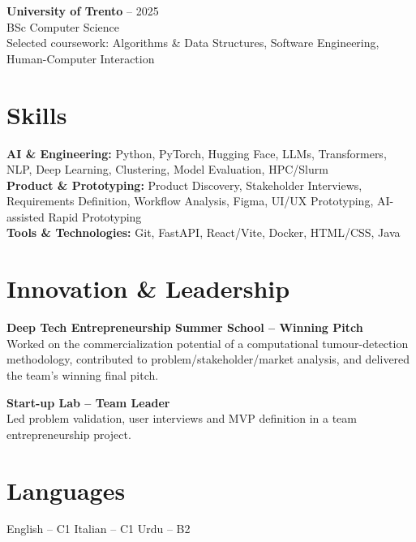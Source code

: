 \documentclass[10pt,a4paper]{article}
\newcommand{\role}[2]{\textbf{#1}{\color{textgray}\space\textbar{}\space#2}}
\newcommand{\place}[1]{{\color{textgray}#1}}
\begin{document}
\role{University of Trento}{2021 -- 2025}\\
BSc Computer Science\\
\place{Selected coursework: Algorithms \& Data Structures, Software Engineering, Human-Computer Interaction}

\section*{Skills}
\textbf{AI \& Engineering:} Python, PyTorch, Hugging Face, LLMs, Transformers, NLP, Deep Learning, Clustering, Model Evaluation, HPC/Slurm\\
\textbf{Product \& Prototyping:} Product Discovery, Stakeholder Interviews, Requirements Definition, Workflow Analysis, Figma, UI/UX Prototyping, AI-assisted Rapid Prototyping\\
\textbf{Tools \& Technologies:} Git, FastAPI, React/Vite, Docker, HTML/CSS, Java

\section*{Innovation \& Leadership}
\textbf{Deep Tech Entrepreneurship Summer School -- Winning Pitch}\\
Worked on the commercialization potential of a computational tumour-detection methodology, contributed to problem/stakeholder/market analysis, and delivered the team's winning final pitch.

\textbf{Start-up Lab -- Team Leader}\\
Led problem validation, user interviews and MVP definition in a team entrepreneurship project.

\section*{Languages}
English -- C1 \textbar{} Italian -- C1 \textbar{} Urdu -- B2
\end{document}

